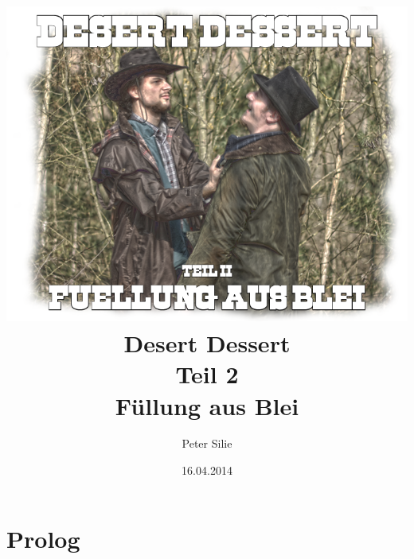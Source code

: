 \documentclass[10pt,a4paper,draft]{book}
\author{Peter Silie}
\title{	\includegraphics[scale=0.5]{titelbild.png}\\
		\vspace{1cm}
		Desert Dessert\\Teil 2\\Füllung aus Blei
		}
\date{16.04.2014}
\begin{document}
\maketitle
\chapter{Prolog}
\end{document}
